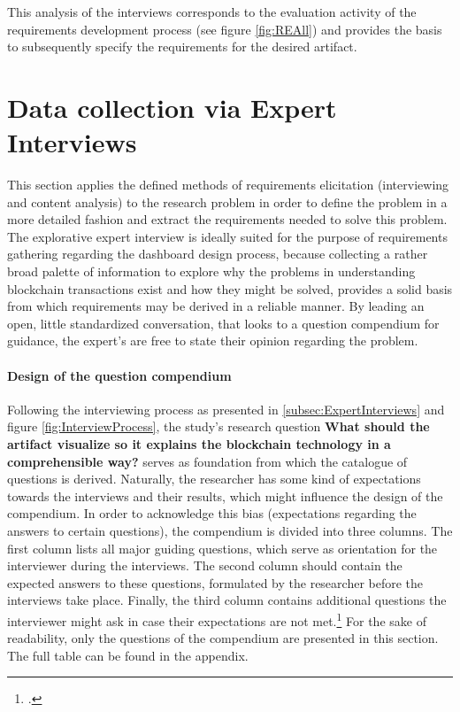 This analysis of the interviews corresponds to the evaluation activity of the requirements development process (see figure \ref{fig:REAll}) and provides the basis to subsequently specify the requirements for the desired artifact. 

\section{Data collection via Expert Interviews}
This section applies the defined methods of requirements elicitation (interviewing and content analysis) to the research problem in order to define the problem in a more detailed fashion and extract the requirements needed to solve this problem. 
The explorative expert interview is ideally suited for the purpose of requirements gathering regarding the dashboard design process, because collecting a rather broad palette of information to explore why the problems in understanding blockchain transactions exist and how they might be solved, provides a solid basis from which requirements may be derived in a reliable manner. By leading an open, little standardized conversation, that looks to a question compendium for guidance, the expert's are free to state their opinion regarding the problem.
\paragraph{Design of the question compendium} Following the interviewing process as presented in \ref{subsec:ExpertInterviews} and figure \ref{fig:InterviewProcess}, the study's research question \textbf{What should the artifact visualize so it explains the blockchain technology in a comprehensible way?} serves as foundation from which the catalogue of questions is derived. Naturally, the researcher has some kind of expectations towards the interviews and their results, which might influence the design of the compendium. In order to acknowledge this bias (expectations regarding the answers to certain questions), the compendium is divided into three columns. The first column lists all major guiding questions, which serve as orientation for the interviewer during the interviews. The second column should contain the expected answers to these questions, formulated by the researcher before the interviews take place. Finally, the third column contains additional questions the interviewer might ask in case their expectations are not met.\footcite[Cf.][p.431]{AghamanoukjanQualitativeInterviews2007} For the sake of readability, only the questions of the compendium are presented in this section. The full table can be found in the appendix.

